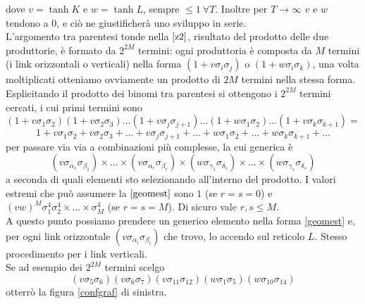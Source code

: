 \documentclass[11pt]{article}
\begin{document}
dove $v=\tanh{K}$ e $w=\tanh{L}$, sempre $\le1 \ \forall T $. Inoltre per $T\to\infty$ $v$ e $w$ tendono a $0$, e ciò ne giustificherà uno sviluppo in serie.\\
L'argomento tra parentesi tonde nella $\ref{z2}$, risultato del prodotto delle due produttorie, è formato da $2^{2M}$ termini: ogni produttoria è composta da $M$ termini (i link orizzontali o verticali) nella forma $(1+v\sigma_i\sigma_j)$ o $(1+w\sigma_i\sigma_k)$, una volta moltiplicati otteniamo ovviamente un prodotto di $2M$ termini nella stessa forma. Esplicitando il prodotto dei binomi tra parentesi si ottengono i $2^{2M}$ termini cercati, i cui primi termini sono
$$
(1+v\sigma_{1}\sigma_{2})(1+v\sigma_{2}\sigma_{3})...(1+v\sigma_{j}\sigma_{j+1})...(1+w\sigma_{1}\sigma_{2})...(1+v\sigma_{k}\sigma_{k+1})=
$$
$$
1+v\sigma_{1}\sigma_{2}+v\sigma_{2}\sigma_{3}+...+v\sigma_{j}\sigma_{j+1}+...+w\sigma_{1}\sigma_{2}+...+w\sigma_{k}\sigma_{k+1}+...
$$
per passare via via a combinazioni più complesse, la cui generica è
\begin{equation}\label{geomest}
(v\sigma_{\alpha_1}\sigma_{\beta_1})\times... \times (v\sigma_{\alpha_r}\sigma_{\beta_r})\times (w\sigma_{\gamma_1}\sigma_{\delta_1}) \times... \times (w\sigma_{\gamma_s}\sigma_{\delta_s})
\end{equation}
a seconda di quali elementi sto selezionando all'interno del prodotto. I valori estremi che può assumere la $\ref{geomest}$ sono $1$ (se $r=s=0$) e $(vw)^M\sigma_1^4\sigma_2^4\times...\times\sigma_M^4$ (se $r=s=M$). Di sicuro vale $r,s \le M$. \\
 A questo punto possiamo prendere un generico elemento nella forma \ref{geomest} e, per ogni link orizzontale $(v\sigma_{\alpha_i}\sigma_{\beta_i})$ che trovo, lo accendo sul reticolo $L$. Stesso procedimento per i link verticali.\\
 Se ad esempio dei $2^{2M}$ termini scelgo
 \begin{equation}\label{esempioprod}
 (v\sigma_{5}\sigma_{6})(v\sigma_{6}\sigma_{7})(v\sigma_{11}\sigma_{12})(w\sigma_{1}\sigma_{5})(w\sigma_{10}\sigma_{14})
 \end{equation}
 otterrò la figura \ref{confgraf} di sinistra.
 
\end{document}
